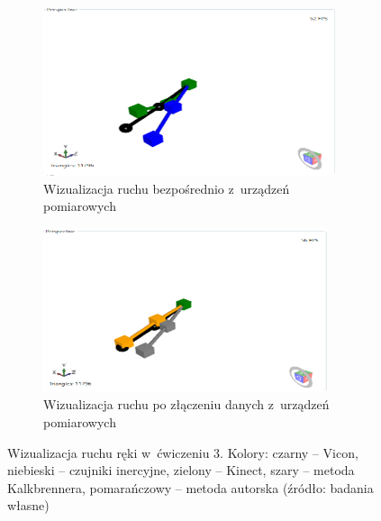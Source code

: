 	\begin{figure}[!htb]
		\captionsetup{singlelinecheck=off}
		\centering
		\begin{subfigure}[b]{0.48\textwidth}
			\centering
			\includegraphics[width=\textwidth]{images/300/raw.png}	
			\caption{Wizualizacja ruchu bezpośrednio z~urządzeń pomiarowych}
			\label{fig:experiments:th:raw}
		\end{subfigure}
							\hfill																																				
		\begin{subfigure}[b]{0.48\textwidth}
			\centering
			\includegraphics[width=\textwidth]{images/300/Fused.png}		
			\caption{Wizualizacja ruchu po złączeniu danych z~urządzeń pomiarowych}
			\label{fig:experiments:th:fused}	
		\end{subfigure}
																																										
		\caption[Wizualizacja ruchu ręki w~ćwiczeniu 3]{Wizualizacja ruchu ręki w~ćwiczeniu 3.  Kolory: czarny -- Vicon, niebieski -- czujniki inercyjne, zielony -- Kinect, szary -- metoda Kalkbrennera, pomarańczowy -- metoda autorska (źródło: badania własne)}	
		\label{fig:experiments:th}
	\end{figure}
																				

